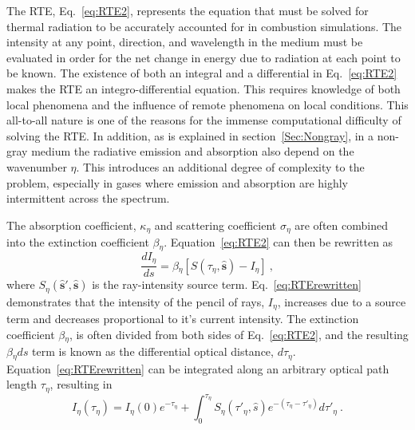 The RTE, Eq.~\ref{eq:RTE2}, represents the equation that must be solved for thermal radiation to be accurately accounted for in combustion simulations. The intensity at any point, direction, and wavelength in the medium must be evaluated in order for the net change in energy due to radiation at each point to be known. The existence of both an integral and a differential in Eq.~\ref{eq:RTE2} makes the RTE an integro-differential equation. 
This requires knowledge of both local phenomena and the influence of remote phenomena on local conditions. 
This all-to-all nature is one of the reasons for the immense computational difficulty of solving the RTE. 
In addition, as is explained in section~\ref{Sec:Nongray}, in a non-gray medium the radiative emission and absorption also depend on the wavenumber $\eta{}$. This introduces an additional degree of complexity to the problem, especially in gases where emission and absorption are highly intermittent across the spectrum.

The absorption coefficient, $\kappa_{\eta{}}$ and scattering coefficient $\sigma{}_\eta{}$ are often combined into the extinction coefficient $\beta{}_\eta{}$. Equation~\ref{eq:RTE2} can then be rewritten as 
\begin{equation}
    \frac{dI_\eta{}}{ds} = \beta{}_\eta{}[S(\tau_\eta,\hat{\textbf{s}})-I_\eta{}] \ ,
    \label{eq:RTErewritten}
\end{equation}
where $S_\eta{}(\hat{\textbf{s}}',\hat{\textbf{s}})$ is the ray-intensity source term. Eq.~\ref{eq:RTErewritten} demonstrates that the intensity of the pencil of rays, $I_\eta{}$, increases due to a source term and decreases proportional to it's current intensity.
The extinction coefficient $\beta{}_\eta{}$, is often divided from both sides of Eq.~\ref{eq:RTE2}, and the resulting $\beta{}_\eta{}ds$ term is known as the differential optical distance, $d\tau{}_\eta{}$.
Equation~\ref{eq:RTErewritten} can be integrated along an arbitrary optical path length $\tau{}_\eta{}$, resulting in
\begin{equation}
    I_\eta{}(\tau{}_\eta{}) = I_\eta{}(0)e^{-\tau{}_\eta{}}+\int_{0}^{\tau{}_\eta{}}{S_\eta{}(\tau{}'_\eta{},\hat{s})e^{-(\tau{}_\eta{}-\tau{}'_\eta{})}}d\tau{}'_\eta{} \ .
    \label{eq:RTE_Solution}
\end{equation}

